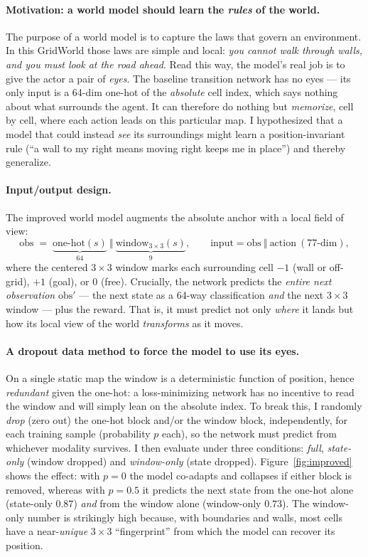 \documentclass[11pt]{article}
\begin{document}
\paragraph{Motivation: a world model should learn the \emph{rules} of the world.}
The purpose of a world model is to capture the laws that govern an environment.
In this GridWorld those laws are simple and local: \emph{you cannot walk through
walls, and you must look at the road ahead}. Read this way, the model's real job
is to give the actor a pair of \emph{eyes}. The baseline transition network has
no eyes --- its only input is a 64-dim one-hot of the \emph{absolute} cell index,
which says nothing about what surrounds the agent. It can therefore do nothing
but \emph{memorize}, cell by cell, where each action leads on this particular
map. I hypothesized that a model that could instead \emph{see} its surroundings
might learn a position-invariant rule (``a wall to my right means moving right
keeps me in place'') and thereby generalize.

\paragraph{Input/output design.}
The improved world model augments the absolute anchor with a local field of view:
\[
  \text{obs} \;=\; \underbrace{\text{one-hot}(s)}_{64}\ \Vert\
  \underbrace{\text{window}_{3\times3}(s)}_{9}, \qquad
  \text{input} = \text{obs}\ \Vert\ \text{action}\ (77\text{-dim}),
\]
where the centered $3\times3$ window marks each surrounding cell $-1$ (wall or
off-grid), $+1$ (goal), or $0$ (free). Crucially, the network predicts the
\emph{entire next observation} $\text{obs}'$ --- the next state as a 64-way
classification \emph{and} the next $3\times3$ window --- plus the reward. That is,
it must predict not only \emph{where} it lands but how its local view of the
world \emph{transforms} as it moves.

\paragraph{A dropout data method to force the model to use its eyes.}
On a single static map the window is a deterministic function of position, hence
\emph{redundant} given the one-hot: a loss-minimizing network has no incentive to
read the window and will simply lean on the absolute index. To break this, I
randomly \emph{drop} (zero out) the one-hot block and/or the window block,
independently, for each training sample (probability $p$ each), so the network
must predict from whichever modality survives. I then evaluate under three
conditions: \emph{full}, \emph{state-only} (window dropped) and \emph{window-only}
(state dropped). Figure~\ref{fig:improved} shows the effect: with $p{=}0$ the
model co-adapts and collapses if either block is removed, whereas with $p{=}0.5$
it predicts the next state from the one-hot alone (state-only $0.87$) \emph{and}
from the window alone (window-only $0.73$). The window-only number is strikingly
high because, with boundaries and walls, most cells have a near-\emph{unique}
$3\times3$ ``fingerprint'' from which the model can recover its position.
\end{document}
